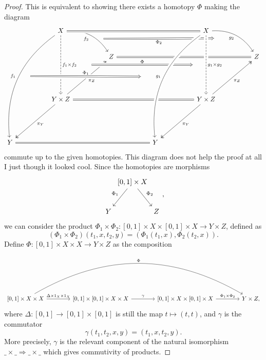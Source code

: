 \documentclass[11pt, letterpaper]{article}
\begin{document}
\begin{proof}
	This is equivalent to showing there exists a homotopy $\Phi $ making the diagram
	\[\begin{tikzcd}[row sep = 2.5em, column sep = 2.5em]
	 &  & X\ar[" f_2 "'{name=f2}, bend left, drr] \ar[" f_1 "'{name=f1}, bend right, dddddll] \ar[" f_1\times f_2 "{name=ff}, dashed, ddd] &  &  &  &  &  & X \ar[" g_2 "'{name=g2}, bend left, drr]\\
	 &  &  &  & Z\ar[equals, rrrrrr]  &  &  &  &  &  & Z \\
	 &  &  &  &  &  &  &  &  \\
	 &  & Y\times Z\ar[equals, rrrrrr]\ar[" \pi _Y ", two heads, ddll]\ar[" \pi _Z "', two heads, uurr] &  &  &  &  &  & Y\times Z\ar[" \pi _Y ", two heads, ddll] \ar[" \pi _Z "', two heads, uurr] \\
	 &  &  &  &  &  &  &  &  \\
	Y\ar[equals, rrrrrr]  &  &  &  &  &  & Y &  & 
	\arrow[from=f2, to=g2, Rightarrow, shorten=20pt, " \Phi_2 "']
	\arrow[from=1-3, to=1-9, crossing over, equals]
	\arrow[from=1-9, to=4-9, dashed, " g_1\times g_2 "{name=gg}, crossing over]
	\arrow[from=ff, to=gg, " \Phi  ", Rightarrow, shorten=20pt, crossing over]
	\arrow[from=1-9, to=6-7, " g_1 "'{name=g1}, bend right, crossing over]
	\arrow[from=f1, to=g1, Rightarrow, crossing over, shorten=20pt, " \Phi_1 "]
	\end{tikzcd}\]
	commute up to the given homotopies. This diagram does not help the proof at all I just though it looked cool. Since the homotopies are morphisms
	\[\begin{tikzcd}[row sep = 2.5em, column sep = 0em]
	 & \left[ 0,1 \right] \times X\ar[" \Phi _2 ", dr] \ar[" \Phi _1 "', dl]  &  \\
	Y &  & Z
	\end{tikzcd},\]
	we can consider the product $\Phi _1\times \Phi _2: [0,1]\times X\times [0,1]\times X \to Y\times Z$, defined as
	\[
		(\Phi _1\times \Phi _2)(t_1,x,t_2,y)=(\Phi _1(t_1,x),\Phi _2(t_2,x))
	.\]
	Define $\Phi : [0,1]\times X\times X \to Y\times Z$ as the composition
	\[\begin{tikzcd}[row sep = 2.5em, column sep = 4em]
		\left[ 0,1 \right] \times X\times X\ar[bend left, " \Phi  ", rrr]\ar[" \Delta\times 1_X\times 1_X ", r]  & \left[ 0,1 \right] \times \left[ 0,1 \right] \times X\times X\ar[" \gamma  ", r]  & \left[ 0,1 \right] \times X\times \left[ 0,1 \right] \times X\ar[" \Phi _1\times \Phi _2 ", r] & Y\times Z,
	\end{tikzcd}\]
	where $\Delta : \left[ 0,1 \right]  \to \left[ 0,1 \right] \times \left[ 0,1 \right] $ is still the map $t\mapsto (t,t)$, and $\gamma$ is the commutator
	\[
		\gamma (t_1,t_2,x,y)=(t_1,x,t_2,y)
	.\]
	More precisely, $\gamma $ is the relevant component of the natural isomorphism $\_\times \_\Rightarrow \_\times \_$ which gives commutivity of products.


\end{proof}
\end{document}
